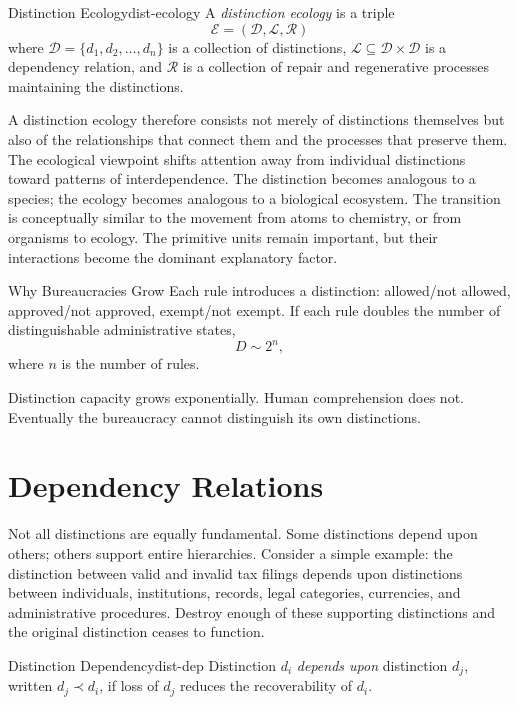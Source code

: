 \documentclass[12pt,twoside,openright]{book}
\begin{document}
\begin{definition}{Distinction Ecology}{dist-ecology}
  A \emph{distinction ecology} is a triple
  \[
    \mathcal{E} = (\mathcal{D}, \mathcal{L}, \mathcal{R})
  \]
  where $\mathcal{D} = \{d_1,d_2,\ldots,d_n\}$ is a
  collection of distinctions, $\mathcal{L} \subseteq
  \mathcal{D}\times\mathcal{D}$ is a dependency relation,
  and $\mathcal{R}$ is a collection of repair and
  regenerative processes maintaining the distinctions.
\end{definition}

A distinction ecology therefore consists not merely of
distinctions themselves but also of the relationships that
connect them and the processes that preserve them. The
ecological viewpoint shifts attention away from individual
distinctions toward patterns of interdependence. The
distinction becomes analogous to a species; the ecology
becomes analogous to a biological ecosystem. The transition
is conceptually similar to the movement from atoms to
chemistry, or from organisms to ecology. The primitive
units remain important, but their interactions become the
dominant explanatory factor.

\begin{envelopeaside}{Why Bureaucracies Grow}
Each rule introduces a distinction: allowed/not allowed,
approved/not approved, exempt/not exempt. If each rule
doubles the number of distinguishable administrative states,
\[
  D \sim 2^n,
\]
where $n$ is the number of rules.

Distinction capacity grows exponentially. Human comprehension
does not. Eventually the bureaucracy cannot distinguish its
own distinctions.
\end{envelopeaside}

\section{Dependency Relations}
\label{sec:ch12-dependency}

Not all distinctions are equally fundamental. Some
distinctions depend upon others; others support entire
hierarchies. Consider a simple example: the distinction
between valid and invalid tax filings depends upon
distinctions between individuals, institutions, records,
legal categories, currencies, and administrative
procedures. Destroy enough of these supporting distinctions
and the original distinction ceases to function.

\begin{definition}{Distinction Dependency}{dist-dep}
  Distinction $d_i$ \emph{depends upon} distinction $d_j$,
  written $d_j \prec d_i$, if loss of $d_j$ reduces the
  recoverability of $d_i$.
\end{definition}
\end{document}
